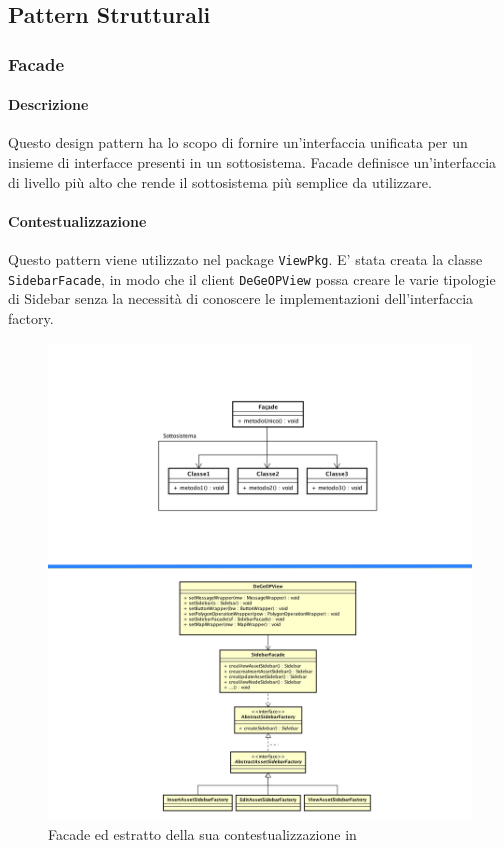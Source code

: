 \newpage
\subsection{Pattern Strutturali}
\subsubsection{Facade}
\paragraph{Descrizione}
Questo design pattern ha lo scopo di fornire un'interfaccia unificata per un insieme di interfacce presenti in un sottosistema. Facade definisce un'interfaccia di livello più alto che rende il sottosistema più semplice da utilizzare.
\paragraph{Contestualizzazione}
Questo pattern viene utilizzato nel package \texttt{ViewPkg}. E' stata creata la classe \texttt{SidebarFacade}, in modo che il client \texttt{DeGeOPView} possa creare le varie tipologie di Sidebar senza la necessità di conoscere le implementazioni dell'interfaccia factory.
	\begin{figure}[H]
		\label{builder_compara}
		\centering
		\includegraphics[scale=0.15]{img/facadeComparati.png}
		\caption{Facade ed estratto della sua contestualizzazione in \progetto}
	\end{figure}


